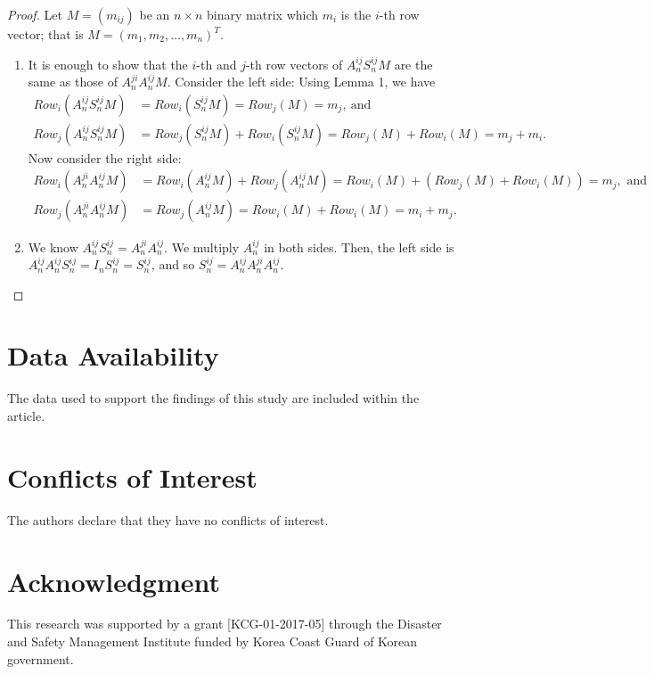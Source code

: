 \myprop*
\begin{proof}
	Let $ M=(m_{ij} ) $ be an $ n\times n $ binary matrix which $ m_i $ is the $ i $-th row vector; that is $ M=(m_1,m_2,…,m_n )^T $.
	\begin{enumerate}
		\item It is enough to show that the $ i $-th and $ j $-th row vectors of $ A_n^{ij} S_n^{ij} M $ are the same as those of $ A_n^{ji} A_n^{ij}  M $. Consider the left side: Using Lemma 1, we have 
		\begin{align*}
		Row_i (A_n^{ij} S_n^{ij} M)&=Row_i (S_n^{ij} M)=Row_j (M)=m_j,\ \text{and}\\
		Row_j (A_n^{ij} S_n^{ij} M)&=Row_j (S_n^{ij} M)+Row_i (S_n^{ij} M)=Row_j (M)+Row_i (M)=m_j+m_i .
		\end{align*}
		Now consider the right side:
		\begin{align*}
		Row_i (A_n^{ji} A_n^{ij} M)&=Row_i (A_n^{ij} M)+Row_j (A_n^{ij} M)=Row_i (M)+(Row_j (M)+Row_i (M))=m_j, \text{ and} \\
		Row_j (A_n^{ji} A_n^{ij} M)&=Row_j (A_n^{ij} M)=Row_i (M)+Row_i (M) = m_i+m_j .
		\end{align*}
		\item 	We know $ A_n^{ij} S_n^{ij} = A_n^{ji} A_n^{ij} $. We multiply $ A_n^{ij} $ in both sides. Then, the left side is $ A_n^{ij} A_n^{ij} S_n^{ij}=I_n S_n^{ij}=S_n^{ij} $, and so $ S_n^{ij}=A_n^{ij} A_n^{ji} A_n^{ij} $.
	\end{enumerate}
\end{proof}

\section*{Data Availability}
The data used to support the findings of this study are included within the article.

\section*{Conflicts of Interest}
The authors declare that they have no conflicts of interest.

\section*{Acknowledgment}
This research was supported by a grant [KCG-01-2017-05] through the Disaster and Safety Management Institute funded by Korea Coast Guard of Korean government.
